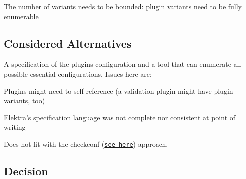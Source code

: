 \begin{DoxyItemize}
\item The number of variants needs to be bounded\+: plugin variants need to be fully enumerable
\end{DoxyItemize}

\subsection*{Considered Alternatives}

A specification of the plugin\textquotesingle{}s configuration and a tool that can enumerate all possible essential configurations. Issues here are\+:


\begin{DoxyItemize}
\item Plugins might need to self-\/reference (a validation plugin might have plugin variants, too)
\item Elektra’s specification language was not complete nor consistent at point of writing
\item Does not fit with the {\ttfamily checkconf} (\href{https://git.libelektra.org/issues/559}{\tt see here}) approach.
\end{DoxyItemize}

\subsection*{Decision}


